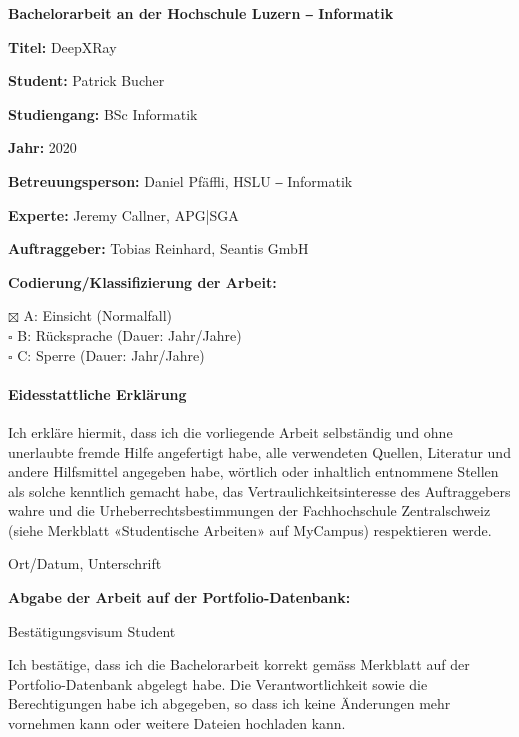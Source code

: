 {
\setlength{\parindent}{0cm}
\setlength{\parskip}{13pt}

\textbf{Bachelorarbeit an der Hochschule Luzern ‒ Informatik}

\textbf{Titel:} DeepXRay

\textbf{Student:} Patrick Bucher

\textbf{Studiengang:} BSc Informatik

\textbf{Jahr:} 2020

\textbf{Betreuungsperson:} Daniel Pfäffli, HSLU ‒ Informatik

\textbf{Experte:} Jeremy Callner, APG|SGA

\textbf{Auftraggeber:} Tobias Reinhard, Seantis GmbH

\textbf{Codierung/Klassifizierung der Arbeit:}

$\boxtimes$ A: Einsicht \tabto{3.5cm}    (Normalfall) \\
$\square$ B: Rücksprache \tabto{3.5cm} (Dauer: \underline{\hspace*{0.5cm}} Jahr/Jahre) \\
$\square$ C: Sperre \tabto{3.5cm}      (Dauer: \underline{\hspace*{0.5cm}} Jahr/Jahre)

\paragraph{\textbf{Eidesstattliche Erklärung}}

Ich erkläre hiermit, dass ich die vorliegende Arbeit selbständig und ohne unerlaubte fremde Hilfe angefertigt habe, alle verwendeten Quellen, Literatur und andere Hilfsmittel angegeben habe, wörtlich oder inhaltlich entnommene Stellen als solche kenntlich gemacht habe, das Vertraulichkeitsinteresse des Auftraggebers wahre und die Urheberrechtsbestimmungen der Fachhochschule Zentralschweiz (siehe Merkblatt «Studentische Arbeiten» auf MyCampus) respektieren werde.

\vspace{13pt}

Ort/Datum, Unterschrift \hspace{0.25cm} \underline{\hspace*{9cm}} 

\newpage
\thispagestyle{empty}

\textbf{Abgabe der Arbeit auf der Portfolio-Datenbank:}

Bestätigungsvisum Student

Ich bestätige, dass ich die Bachelorarbeit korrekt gemäss Merkblatt auf der Portfolio-Datenbank abgelegt habe. Die Verantwortlichkeit sowie die Berechtigungen habe ich abgegeben, so dass ich keine Änderungen mehr vornehmen kann oder weitere Dateien hochladen kann.

}
